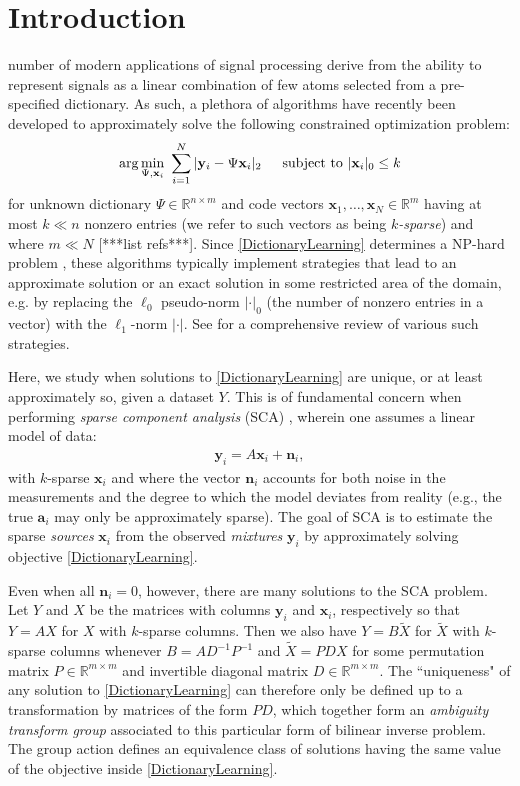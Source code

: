 \documentclass[journal, onecolumn]{IEEEtran}
\begin{document}
\section{Introduction}
 number of modern applications of signal processing derive from the ability to represent signals as a linear combination of few atoms selected from a pre-specified dictionary. As such, a plethora of algorithms have recently been developed to approximately solve the following constrained optimization problem:
\begin{align}\label{DictionaryLearning}
\arg \min_{\Psi, \mathbf{x}_i} \  \sum_{i=1}^N |\mathbf{y}_i - \Psi\mathbf{x}_i|_2 \indent \text{subject to } |\mathbf{x}_i|_0 \leq k
\end{align}
%
for unknown dictionary $\Psi \in \mathbb{R}^{n \times m}$ and code vectors $\mathbf{x}_1, \ldots, \mathbf{x}_N \in \mathbb{R}^m$ having at most $k \ll n$ nonzero entries (we refer to such vectors as being \emph{$k$-sparse}) and where $m \ll N$ [***list refs***]. Since \eqref{DictionaryLearning} determines a NP-hard problem \cite{Tillman15}, these algorithms typically implement strategies that lead to an approximate solution or an exact solution in some restricted area of the domain, e.g. by replacing the $\ell_0$ pseudo-norm $|\cdot|_0$ (the number of nonzero entries in a vector) with the $\ell_1$-norm $|\cdot|$. See \cite{Zhang} for a comprehensive review of various such strategies. 

Here, we study when solutions to \eqref{DictionaryLearning} are unique, or at least approximately so, given a dataset $Y$. This is of fundamental concern when performing \emph{sparse component analysis} (SCA) \cite{Georgiev05}, wherein one assumes a linear model of data:
\begin{align}\label{LinearModel}
\mathbf{y}_i = A\mathbf{x}_i + \mathbf{n}_i,
\end{align}
with $k$-sparse $\mathbf{x}_i$ and where the vector $\mathbf{n}_i$ accounts for both noise in the measurements and the degree to which the model deviates from reality (e.g., the true $\mathbf{a}_i$ may only be approximately sparse). The goal of SCA is to estimate the sparse \emph{sources} $\mathbf{x}_i$ from the observed \emph{mixtures} $\mathbf{y}_i$ by approximately solving objective \eqref{DictionaryLearning}.

Even when all $\mathbf{n}_i = 0$, however, there are many solutions to the SCA problem. Let $Y$ and $X$ be the matrices with columns $\mathbf{y}_i$ and $\mathbf{x}_i$, respectively so that $Y = AX$ for $X$ with $k$-sparse columns. Then we also have $Y = B \tilde X$ for $\tilde X$ with $k$-sparse columns whenever $B = AD^{-1}P^{-1}$ and $\tilde X = PDX$ for some permutation matrix $P \in \mathbb{R}^{m \times m}$ and invertible diagonal matrix $D \in \mathbb{R}^{m \times m}$. The ``uniqueness" of any solution to \eqref{DictionaryLearning} can therefore only be defined up to a transformation by matrices of the form $PD$, which together form an \emph{ambiguity transform group} \cite{?} associated to this particular form of bilinear inverse problem. The group action defines an equivalence class of solutions having the same value of the objective inside \eqref{DictionaryLearning}. 
\end{document}
